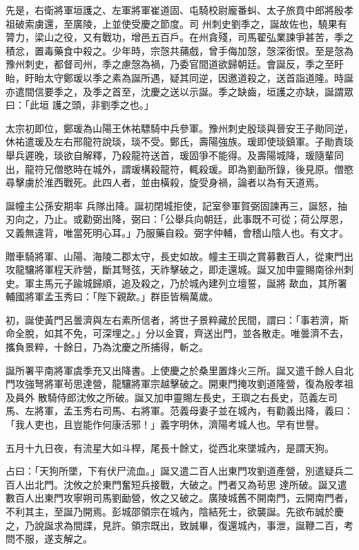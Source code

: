 \begin{pinyinscope}
 先是，右衛將軍垣護之、左軍將軍崔道固、屯騎校尉龐番虯、太子旅賁中郎將殷孝祖破索虜還，至廣陵，上並使受慶之節度。司
 州刺史劉季之，誕故佐也，驍果有膂力，梁山之役，又有戰功，增邑五百戶。在州貪殘，司馬翟弘業諫爭甚苦，季之積忿，置毒藥食中殺之。少年時，宗愨共蒱戲，曾手侮加愨，愨深銜恨。至是愨為豫州刺史，都督司州，季之慮愨為禍，乃委官間道欲歸朝廷。會誕反，季之至盱眙，盱眙太守鄭瑗以季之素為誕所遇，疑其同逆，因邀道殺之，送首詣道隆。時誕亦遣間信要季之，及季之首至，沈慶之送以示誕。季之缺齒，垣護之亦缺，誕謂眾曰：「此垣
 護之頭，非劉季之也。」



 太宗初即位，鄭瑗為山陽王休祐驃騎中兵參軍。豫州刺史殷琰與晉安王子勛同逆，休祐遣瑗及左右邢龍符說琰，琰不受。鄭氏，壽陽強族。瑗即使琰鎮軍。子勛責琰舉兵遲晚，琰欲自解釋，乃殺龍符送首，瑗固爭不能得。及壽陽城降，瑗隨輩同出，龍符兄僧愍時在城外，謂瑗構殺龍符，輒殺瑗。即為劉勔所錄，後見原。僧愍尋擊虜於淮西戰死。此四人者，並由橫殺，旋受身禍，論者以為有天道焉。



 誕幢主公孫安期率
 兵隊出降。誕初閉城拒使，記室參軍賀弼固諫再三，誕怒，抽刃向之，乃止。或勸弼出降，弼曰：「公舉兵向朝廷，此事既不可從；荷公厚恩，又義無違背，唯當死明心耳。」乃服藥自殺。弼字仲輔，會稽山陰人也。有文才。



 贈車騎將軍、山陽、海陵二郡太守，長史如故。幢主王璵之賞募數百人，從東門出攻龍驤將軍程天祚營，斷其弩弦，天祚擊破之，即走還城。誕又加申靈賜南徐州刺史。軍主馬元子踰城歸順，追及殺之，乃於城內建列立壇誓，誕將
 歃血，其所署輔國將軍孟玉秀曰：「陛下親歃。」群臣皆稱萬歲。



 初，誕使黃門呂曇濟與左右素所信者，將世子景粹藏於民間，謂曰：「事若濟，斯命全脫，如其不免，可深埋之。」分以金寶，齊送出門，並各散走。唯曇濟不去，攜負景粹，十餘日，乃為沈慶之所捕得，斬之。



 誕所署平南將軍虞季充又出降書。上使慶之於桑里置烽火三所。誕又遣千餘人自北門攻強弩將軍茍思達營，龍驤將軍宗越擊破之。開東門掩攻劉道隆營，復為殷孝祖及員外
 散騎侍郎沈攸之所破。誕又加申靈賜左長史，王璵之右長史，范義左司馬、左將軍，孟玉秀右司馬、右將軍。范義母妻子並在城內，有勸義出降，義曰：「我人吏也，且豈能作何康活邪！」義字明休，濟陽考城人也。早有世譽。



 五月十九日夜，有流星大如斗桿，尾長十餘丈，從西北來墜城內，是謂天狗。



 占曰：「天狗所墜，下有伏尸流血。」誕又遣二百人出東門攻劉道產營，別遣疑兵二百人出北門。沈攸之於東門奮短兵接戰，大破之。門者又為茍思
 達所破。誕又遣數百人出東門攻寧朔司馬劉勔營，攸之又破之。廣陵城舊不開南門，云開南門者，不利其主，至誕乃開焉。彭城邵領宗在城內，陰結死士，欲襲誕。先欲布誠於慶之，乃說誕求為間諜，見許。領宗既出，致誠畢，復還城內，事泄，誕鞭二百，考問不服，遂支解之。




\end{pinyinscope}

